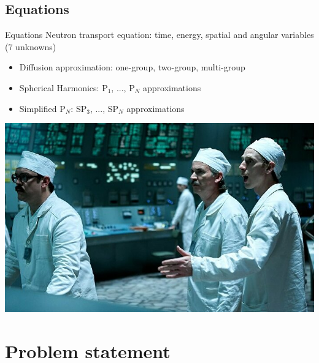 \documentclass[10pt,pdf,hyperref={unicode}]{beamer}
\begin{document}
\subsection{Equations}
	\begin{frame}{Equations}
		Neutron transport equation: time, energy, spatial and angular variables (7 unknowns)

		\begin{itemize}
			\item Diffusion approximation: one-group, two-group, multi-group
			\item Spherical Harmonics: P$_1$, ..., P$_N$ approximations
			\item Simplified P$_N$: SP$_3$, ..., SP$_N$ approximations
		\end{itemize}
	
		\begin{center}
			\includegraphics[width=0.7\linewidth] {chernob.jpg}	
		\end{center}
	\end{frame}

\section{Problem statement}
\end{document}
